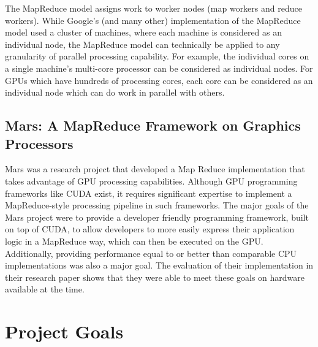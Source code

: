 \documentclass{article}
\begin{document}
The MapReduce model assigns work to worker nodes (map workers and reduce workers). While Google's (and many other) implementation of the MapReduce model used a cluster of machines, where each machine is considered as an individual node, the MapReduce model can technically be applied to any granularity of parallel processing capability. For example, the individual cores on a single machine's multi-core processor can be considered
as individual nodes. For GPUs which have hundreds of processing cores, each core can be considered as an individual node which can do work in parallel with others. 

\subsection{Mars: A MapReduce Framework on Graphics Processors}
Mars was a research project that developed a Map Reduce implementation that takes advantage of GPU processing capabilities. Although GPU programming frameworks like CUDA \cite{cuda_docs} exist, it requires significant expertise to implement a MapReduce-style processing pipeline in such frameworks. The major goals of the Mars project were to provide a developer friendly programming framework, built on top of CUDA, to allow developers to more easily express their application logic in a MapReduce way, which can then be executed on the GPU. Additionally, providing performance equal to or better than comparable CPU implementations was also a major goal. The evaluation of their implementation in their research paper shows that they were able to meet these goals on hardware available at the time. 


\section{Project Goals}
\end{document}
